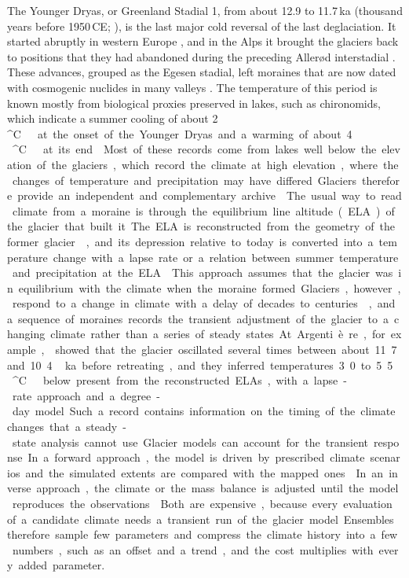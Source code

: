 \documentclass[tc, manuscript]{copernicus}
\newcommand{\degC}{\unit{^{\circ}C}}
\begin{document}
\introduction
\label{sec:intro}

The Younger Dryas, or Greenland Stadial 1, from about 12.9 to 11.7\,ka (thousand years before 1950\,CE; \citealp{rasmussen2014}), is the last major cold reversal of the last deglaciation. It started abruptly in western Europe \citep{brauer2008}, and in the Alps it brought the glaciers back to positions that they had abandoned during the preceding Aller\o d interstadial \citep{ivyochs2009,ivyochs2015}. These advances, grouped as the Egesen stadial, left moraines that are now dated with cosmogenic nuclides in many valleys \citep{schindelwig2012,chenet2016,moran2016,boxleitner2019,protin2019,protin2021,baroni2021}. The temperature of this period is known mostly from biological proxies preserved in lakes, such as chironomids, which indicate a summer cooling of about 2\,\degC\ at the onset of the Younger Dryas and a warming of about 4\,\degC\ at its end \citep{ilyashuk2009,samartin2012jqs,heiri2014,heiri2015}. Most of these records come from lakes well below the elevation of the glaciers, which record the climate at high elevation, where the changes of temperature and precipitation may have differed. Glaciers therefore provide an independent and complementary archive \citep{kerschner2000,kerschner2008,rea2020}.

The usual way to read climate from a moraine is through the equilibrium line altitude (ELA) of the glacier that built it. The ELA is reconstructed from the geometry of the former glacier \citep{benn2000,pellitero2016}, and its depression relative to today is converted into a temperature change with a lapse rate or a relation between summer temperature and precipitation at the ELA \citep{ohmura1992}. This approach assumes that the glacier was in equilibrium with the climate when the moraine formed. Glaciers, however, respond to a change in climate with a delay of decades to centuries \citep{johannesson1989,roe2011}, and a sequence of moraines records the transient adjustment of the glacier to a changing climate rather than a series of steady states. At Argenti\`ere, for example, \citet{protin2019} showed that the glacier oscillated several times between about 11.7 and 10.4\,ka before retreating, and they inferred temperatures 3.0 to 5.5\,\degC\ below present from the reconstructed ELAs, with a lapse-rate approach and a degree-day model. Such a record contains information on the timing of the climate changes that a steady-state analysis cannot use.

Glacier models can account for the transient response. In a forward approach, the model is driven by prescribed climate scenarios and the simulated extents are compared with the mapped ones \citep{seguinot2018,imhof2019,jouvet2023alps,leger2025}. In an inverse approach, the climate or the mass balance is adjusted until the model reproduces the observations \citep{oerlemans2005,leclercq2012,visnjevic2018,visnjevic2020,eis2019,eis2021,lleshi2025}. Both are expensive, because every evaluation of a candidate climate needs a transient run of the glacier model. Ensembles therefore sample few parameters and compress the climate history into a few numbers, such as an offset and a trend, and the cost multiplies with every added parameter.
\end{document}

